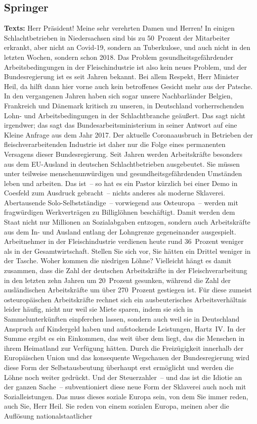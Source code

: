 \documentclass{article}
\begin{document}
\subsection{Springer}
\noindent\textbf{Texts:} Herr Präsident! Meine sehr verehrten Damen und Herren! In einigen Schlachtbetrieben in Niedersachsen sind bis zu 50 Prozent der Mitarbeiter erkrankt, aber nicht an Covid‑19, sondern an Tuberkulose, und auch nicht in den letzten Wochen, sondern schon 2018. Das Problem gesundheitsgefährdender Arbeitsbedingungen in der Fleischindustrie ist also kein neues Problem, und der Bundesregierung ist es seit Jahren bekannt. Bei allem Respekt, Herr Minister Heil, da hilft dann hier vorne auch kein betroffenes Gesicht mehr aus der Patsche.  In den vergangenen Jahren haben sich sogar unsere Nachbarländer Belgien, Frankreich und Dänemark kritisch zu unseren, in Deutschland vorherrschenden Lohn- und Arbeitsbedingungen in der Schlachtbranche geäußert. Das sagt nicht irgendwer; das sagt das Bundesarbeitsministerium in seiner Antwort auf eine Kleine Anfrage aus dem Jahr 2017. Der aktuelle Coronaausbruch in Betrieben der fleischverarbeitenden Industrie ist daher nur die Folge eines permanenten Versagens dieser Bundesregierung.  Seit Jahren werden Arbeitskräfte besonders aus dem EU-Ausland in deutschen Schlachtbetrieben ausgebeutet. Sie müssen unter teilweise menschenunwürdigen und gesundheitsgefährdenden Umständen leben und arbeiten. Das ist – so hat es ein Pastor kürzlich bei einer Demo in Coesfeld zum Ausdruck gebracht – nichts anderes als moderne Sklaverei.  Abertausende Solo-Selbstständige – vorwiegend aus Osteuropa – werden mit fragwürdigen Werkverträgen zu Billiglöhnen beschäftigt. Damit werden dem Staat nicht nur Millionen an Sozialabgaben entzogen, sondern auch Arbeitskräfte aus dem In- und Ausland entlang der Lohngrenze gegeneinander ausgespielt. Arbeitnehmer in der Fleischindustrie verdienen heute rund 36 Prozent weniger als in der Gesamtwirtschaft. Stellen Sie sich vor, Sie hätten ein Drittel weniger in der Tasche. Woher kommen die niedrigen Löhne? Vielleicht hängt es damit zusammen, dass die Zahl der deutschen Arbeitskräfte in der Fleischverarbeitung in den letzten zehn Jahren um 20 Prozent gesunken, während die Zahl der ausländischen Arbeitskräfte um über 270 Prozent gestiegen ist. Für diese zumeist osteuropäischen Arbeitskräfte rechnet sich ein ausbeuterisches Arbeitsverhältnis leider häufig, nicht nur weil sie Miete sparen, indem sie sich in Sammelunterkünften einpferchen lassen, sondern auch weil sie in Deutschland Anspruch auf Kindergeld haben  und aufstockende Leistungen, Hartz IV. In der Summe ergibt es ein Einkommen, das weit über dem liegt, das die Menschen in ihrem Heimatland zur Verfügung hätten. Durch die Freizügigkeit innerhalb der Europäischen Union und das konsequente Wegschauen der Bundesregierung wird diese Form der Selbstausbeutung überhaupt erst ermöglicht und werden die Löhne noch weiter gedrückt. Und der Steuerzahler – und das ist die Idiotie an der ganzen Sache – subventioniert diese neue Form der Sklaverei auch noch mit Sozialleistungen.  Das muss dieses soziale Europa sein, von dem Sie immer reden, auch Sie, Herr Heil. Sie reden von einem sozialen Europa, meinen aber die Auflösung nationalstaatlicher 
\end{document}
